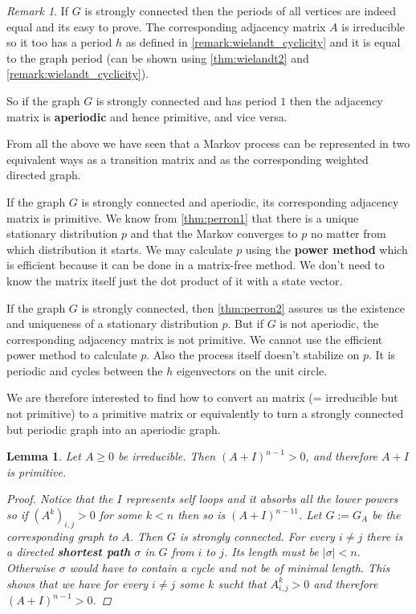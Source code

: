 \documentclass[a4paper,10pt]{article}
\newcommand{\gt}{>}
\newcommand{\lt}{<}
\theoremstyle{definition}
\theoremstyle{remark}
\newtheorem{remark}{Remark}
\theoremstyle{plain}
\newtheorem{lemma}{Lemma}[section]
\begin{document}
\begin{remark}
\label{remark:periods}
If $G$ is strongly connected then the periods of all vertices are indeed equal
and its easy to prove. The corresponding adjacency matrix $A$ is irreducible so
it too has a period $h$ as defined in \ref{remark:wielandt_cyclicity} and it is
equal to the graph period (can be shown using \ref{thm:wielandt2} and
\ref{remark:wielandt_cyclicity}).

So if the graph $G$ is strongly connected and has period $1$
then the adjacency matrix is \textbf{aperiodic} and hence primitive, and vice versa. 
\end{remark}

From all the above we have seen that a Markov process can be represented in two
equivalent ways \textemdash as a transition matrix  and as the 
corresponding weighted directed graph.

If the graph $G$ is strongly connected and aperiodic, its corresponding
adjacency matrix is primitive. We know from \ref{thm:perron1} that there is a
unique stationary distribution $p$ and that the Markov converges to $p$ no
matter from which distribution it starts. We may calculate $p$ using the
\textbf{power
method} which is efficient because it can be done in a matrix-free method. 
We don't need to know the matrix itself just the dot product of it with a state
vector.

If the graph $G$ is strongly connected, then \ref{thm:perron2} assures us the
existence and uniqueness of a stationary distribution $p$. But if $G$ is not
aperiodic, the corresponding adjacency matrix is not primitive. We cannot use
the efficient power method to calculate $p$. Also the process itself doesn't
stabilize on $p$. It is periodic and cycles between the $h$ eigenvectors on
the unit circle. 

We are therefore interested to find how to convert an 
matrix (= irreducible but not primitive)
to a primitive matrix or equivalently to turn a strongly connected but periodic graph
into an aperiodic graph.

\begin{lemma}
\label{lem:1plusA}
Let $A \geq 0$ be irreducible. Then $(A + I)^{n-1} \gt 0$, and therefore $A+I$
is primitive.
\begin{proof}
Notice that the $I$ represents self loops and it absorbs all the lower powers so
if $(A^k)_{i,j} \gt 0$ for some $k \lt n$ then so is $(A+I)^{n-11}$.
Let $G := G_A$ be the corresponding graph to $A$. Then $G$ is strongly
connected. For every $i \neq j$ there is a directed \textbf{shortest path}
$\sigma$ in $G$ from $i$ to $j$. Its length must be $|\sigma| \lt n$. Otherwise
$\sigma$ would have to contain a cycle and not be of minimal length.
This shows that we have for every $i \neq j$ some $k$ sucht that $A^k_{i,j} \gt
0$ and therefore $(A+I)^{n-1} \gt 0$.
\end{proof}
\end{lemma}
\end{document}
